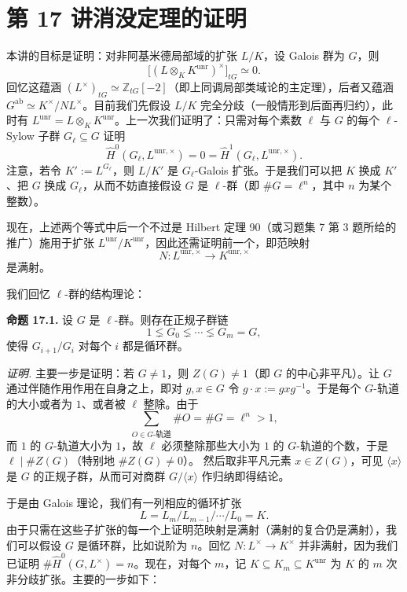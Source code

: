\section*{第 17 讲\quad 消没定理的证明}

本讲的目标是证明：对非阿基米德局部域的扩张 $L/K$，设 Galois 群为 $G$，则
\[
\big[(L\otimes_K K^{\mathrm{unr}})^\times\big]_{tG}\simeq 0.
\]
回忆这蕴涵 $(L^\times)_{tG}\simeq \mathbb Z_{tG}[-2]$（即上同调局部类域论的主定理），后者又蕴涵 $G^{\mathrm{ab}}\simeq K^\times/NL^\times$。目前我们先假设 $L/K$ 完全分歧（一般情形到后面再归约），此时有 $L^{\mathrm{unr}}=L\otimes_K K^{\mathrm{unr}}$。上一次我们证明了：只需对每个素数 $\ell$ 与 $G$ 的每个 $\ell$-Sylow 子群 $G_\ell\subseteq G$ 证明
\[
\widehat H^0(G_\ell,L^{\mathrm{unr},\times})=0=\widehat H^1(G_\ell,L^{\mathrm{unr},\times}).
\]
注意，若令 $K':=L^{G_\ell}$，则 $L/K'$ 是 $G_\ell$-Galois 扩张。于是我们可以把 $K$ 换成 $K'$、把 $G$ 换成 $G_\ell$，从而不妨直接假设 $G$ 是 $\ell$-群（即 $\#G=\ell^n$，其中 $n$ 为某个整数）。

现在，上述两个等式中后一个不过是 Hilbert 定理 90（或习题集 7 第 3 题所给的推广）施用于扩张 $L^{\mathrm{unr}}/K^{\mathrm{unr}}$，因此还需证明前一个，即范映射
\[
N:L^{\mathrm{unr},\times}\to K^{\mathrm{unr},\times}
\]
是满射。

我们回忆 $\ell$-群的结构理论：

\textbf{命题 17.1.} 设 $G$ 是 $\ell$-群。则存在正规子群链
\[
1\lneq G_0\lneq\cdots\lneq G_m=G,
\]
使得 $G_{i+1}/G_i$ 对每个 $i$ 都是循环群。

\textit{证明.} 主要一步是证明：若 $G\neq 1$，则 $Z(G)\neq 1$（即 $G$ 的中心非平凡）。让 $G$ 通过伴随作用作用在自身之上，即对 $g,x\in G$ 令 $g\cdot x:=gxg^{-1}$。于是每个 $G$-轨道的大小或者为 $1$、或者被 $\ell$ 整除。由于
\[
\sum_{O\in G\text{-轨道}}\#O=\#G=\ell^n>1,
\]
而 $1$ 的 $G$-轨道大小为 $1$，故 $\ell$ 必须整除那些大小为 $1$ 的 $G$-轨道的个数，于是 $\ell\mid \#Z(G)$（特别地 $\#Z(G)\neq 0$）。%
然后取非平凡元素 $x\in Z(G)$，可见 $\langle x\rangle$ 是 $G$ 的正规子群，从而可对商群 $G/\langle x\rangle$ 作归纳即得结论。%

于是由 Galois 理论，我们有一列相应的循环扩张
\[
L=L_m/L_{m-1}/\cdots/L_0=K.
\]
由于只需在这些子扩张的每一个上证明范映射是满射（满射的复合仍是满射），我们可以假设 $G$ 是循环群，比如说阶为 $n$。回忆 $N:L^\times\to K^\times$ 并非满射，因为我们已证明 $\#\widehat H^0(G,L^\times)=n$。现在，对每个 $m$，记 $K\subseteq K_m\subseteq K^{\mathrm{unr}}$ 为 $K$ 的 $m$ 次非分歧扩张。主要的一步如下：

